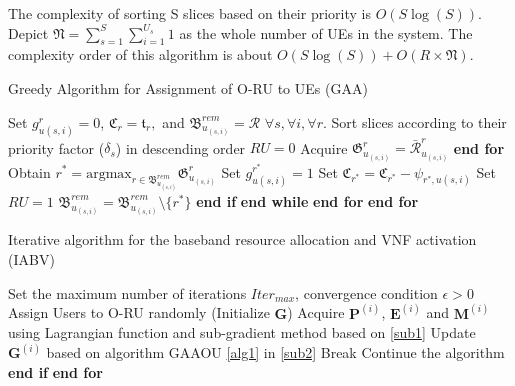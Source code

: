 \documentclass[lettersize,journal]{IEEEtran}
\begin{document}
The complexity of sorting S slices based on their priority is $O(S\log(S))$.
Depict $\mathfrak{N} =  \sum_{s=1}^S\sum_{i=1}^{U_s} 1$ as the whole number of UEs in the system.
The complexity order of this algorithm is about $O(S\log(S)) + O(R\times \mathfrak{N})$.
\begin{algorithm}
\small
\caption{Greedy Algorithm for Assignment of O-RU to UEs (GAA)}\label{alg1}
\begin{algorithmic}[1]
\State Set $g^r_{u(s,i)} = 0$, $\mathfrak{C}_r = \mathfrak{t}_r,$ and ${\mathfrak{B}}^{rem}_{u_{(s,i)}} = \mathcal{R}$   $\forall s, \forall i, \forall r$.\label{31}
\State Sort slices according to their priority factor ($\delta_s$) in descending order
\label{33}
\State $RU = 0$
\State Acquire $\mathfrak{G}^r_{u_{(s,i)}} = \bar{\mathcal{R}}^r_{u_{(s,i)}}$
\EndFor
\State \textbf{end for}
\State Obtain $r^* = \text{argmax}_{r\in{\mathfrak{B}}^{rem}_{u_{(s,i)}}} \mathfrak{G}^r_{u_{(s,i)}}$
\State Set $g^{r^*}_{u(s,i)} = 1$
\State Set  $\mathfrak{C}_{r^*} = \mathfrak{C}_{r^*} - \psi_{{r^*},u(s,i)}$
\State Set $RU = 1$
\Else
\State  ${\mathfrak{B}}^{rem}_{u_{(s,i)}} = {\mathfrak{B}}^{rem}_{u_{(s,i)}} \setminus \{{r^*}\} $
\EndIf
\State \textbf{end if}
\EndWhile
\State \textbf{end while}
\EndFor
\State \textbf{end for}
\EndFor
\State \textbf{end for} \label{34}
\end{algorithmic}
\end{algorithm}

 \begin{algorithm}
 \small
\caption{Iterative algorithm for the baseband resource allocation and VNF activation (IABV)}\label{alg2}
\begin{algorithmic}[1]
\State  Set the maximum number of iterations ${Iter}_{max}$, convergence condition $\epsilon > 0$ \label{a21}
\State  Assign Users to O-RU randomly (Initialize $\boldsymbol{G}$) \label{a22}
\label{23}
\State Acquire $\boldsymbol{P}^{(i)}$, $\boldsymbol{E}^{(i)}$ and $\boldsymbol{M}^{(i)}$ using Lagrangian function and sub-gradient method based on \eqref{sub1}
\State Update $\boldsymbol{G}^{(i)}$   based on algorithm GAAOU \eqref{alg1} in  \eqref{sub2}
\State Break
\Else
\State Continue the algorithm
\EndIf
\State \textbf{end if}
\EndFor
\State \textbf{end for} \label{24}
\end{algorithmic}
\end{algorithm}
\end{document}

